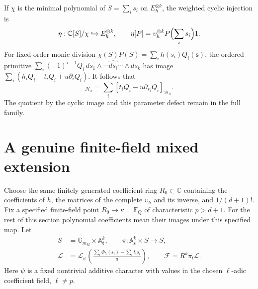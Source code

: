 \documentclass[11pt]{article}
\newcommand{\C}{\mathbb C}
\newcommand{\F}{\mathbb F}
\newcommand{\A}{\mathbb A}
\newcommand{\Gm}{{\mathbb G_m}}
\newcommand{\HH}{\mathcal H}
\begin{document}
If $\chi$ is the minimal polynomial of $S=\sum_i s_i$ on
$E_h^{\otimes k}$, the weighted cyclic injection is
\begin{equation}
 \eta:\C[S]/\chi\hookrightarrow E_h^{\otimes k},\qquad
 \eta[P]=\upsilon_h^{\otimes k}P\Bigl(\sum_i s_i\Bigr)1.
 \label{eq:eta}
\end{equation}
For fixed-order monic division
$\chi(S)P(S)=\sum_i h(s_i)Q_i(\mathbf s)$, the ordered primitive
$\sum_i(-1)^{i-1}Q_i\,ds_1\wedge\cdots\widehat{ds_i}\cdots\wedge ds_k$
has image $\sum_i(h_iQ_i-t_iQ_i+u\partial_iQ_i)$.
It follows that
\begin{equation}
 [\chi(S)P(S)]_{\HH_k}
    =\sum_i[t_iQ_i-u\partial_{s_i}Q_i]_{\HH_k}.
 \label{eq:cyclic-defect}
\end{equation}
The quotient by the cyclic image and this parameter defect remain in
the full family.

\section{A genuine finite-field mixed extension}

Choose the same finitely generated coefficient ring $R_0\subset\C$
containing the coefficients of $h$, the matrices of the complete
$\upsilon_h$ and its inverse, and $1/(d+1)!$.  Fix a specified
finite-field point $R_0\to\kappa=\F_Q$ of characteristic $p>d+1$.
For the rest of this section polynomial coefficients mean their images
under this specified map.  Let
\begin{align}
 S&=\Gm_u\times\A^k_{\mathbf t},\qquad
 \pi:\A^k_{\mathbf s}\times S\longrightarrow S,\nonumber\\
 \mathcal L&=\mathcal L_\psi
       \left(\frac{\sum_i\Phi_h(s_i)-\sum_i t_i s_i}{u}\right),
       \qquad \mathcal F=R^k\pi_!\mathcal L.
 \label{eq:finite-family}
\end{align}
Here $\psi$ is a fixed nontrivial additive character with values in the
chosen $\ell$-adic coefficient field, $\ell\ne p$.
\end{document}
